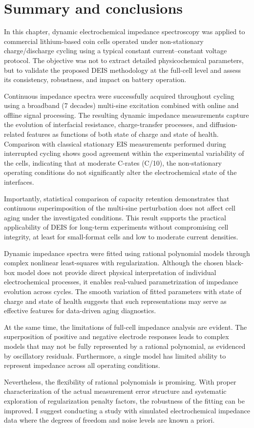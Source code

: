 \section{Summary and conclusions}

In this chapter, dynamic electrochemical impedance spectroscopy was applied to commercial lithium-based coin cells operated under non-stationary charge/discharge cycling using a typical constant current--constant voltage protocol.
The objective was not to extract detailed physicochemical parameters, but to validate the proposed DEIS methodology at the full-cell level and assess its consistency, robustness, and impact on battery operation.

Continuous impedance spectra were successfully acquired throughout cycling using a broadband (7 decades) multi-sine excitation combined with online and offline signal processing.
The resulting dynamic impedance measurements capture the evolution of interfacial resistance, charge-transfer processes, and diffusion-related features as functions of both state of charge and state of health.
Comparison with classical stationary EIS measurements performed during interrupted cycling shows good agreement within the experimental variability of the cells, indicating that at moderate C-rates (C/10), the non-stationary operating conditions do not significantly alter the electrochemical state of the interfaces.

Importantly, statistical comparison of capacity retention demonstrates that continuous superimposition of the multi-sine perturbation does not affect cell aging under the investigated conditions.
This result supports the practical applicability of DEIS for long-term experiments without compromising cell integrity, at least for small-format cells and low to moderate current densities.

Dynamic impedance spectra were fitted using rational polynomial models through complex nonlinear least-squares with regularization.
Although the chosen black-box model does not provide direct physical interpretation of individual electrochemical processes, it enables real-valued parametrization of impedance evolution across cycles.
The smooth variation of fitted parameters with state of charge and state of health suggests that such representations may serve as effective features for data-driven aging diagnostics.

At the same time, the limitations of full-cell impedance analysis are evident.
The superposition of positive and negative electrode responses leads to complex models that may not be fully represented by a rational polynomial, as evidenced by oscillatory residuals.
Furthermore, a single model has limited ability to represent impedance across all operating conditions.

Nevertheless, the flexibility of rational polynomials is promising.
With proper characterization of the actual measurement error structure and systematic exploration of regularization penalty factors, the robustness of the fitting can be improved.
I suggest conducting a study with simulated electrochemical impedance data where the degrees of freedom and noise levels are known a priori.